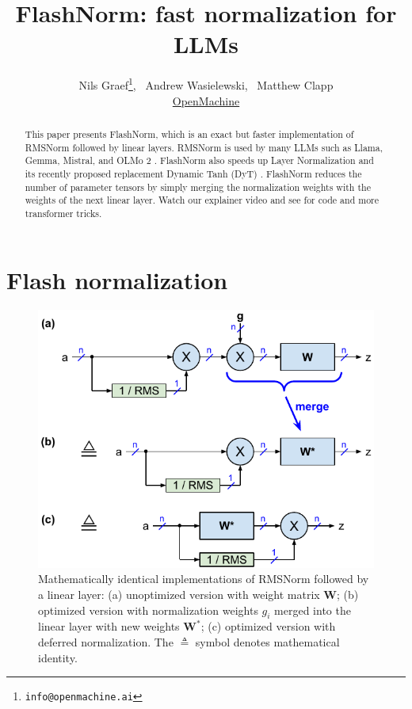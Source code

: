 \documentclass{article}
\title{FlashNorm: fast normalization for LLMs}
\author{Nils Graef\thanks{\texttt{info@openmachine.ai}}, \, Andrew Wasielewski, \, Matthew Clapp \\
  \href{https://openmachine.ai}{OpenMachine}}
\newcommand{\mat}[1]{\mathbf{#1}}     %
\def\W*{\mat{W}^\ast}                 %
\begin{document}
 \maketitle

\begin{abstract}
This paper presents FlashNorm, which is an exact but faster implementation of RMSNorm followed by linear layers. RMSNorm \citep{rms} is used by many LLMs such as Llama, Gemma, Mistral, and OLMo 2 \citep{LLaMA, gemma, mistral, olmo2}. FlashNorm also speeds up Layer Normalization \citep{layerNorm} and its recently proposed replacement Dynamic Tanh (DyT) \citep{DyT}. FlashNorm reduces the number of parameter tensors by simply merging the normalization weights with the weights of the next linear layer. Watch our explainer video \citep{flashNorm-video} and see \citep{slimAttn, tricks, remove, precompute} for code and more transformer tricks.
\end{abstract}

\section{Flash normalization}
\begin{figure}[h!] \centering  %
  \includegraphics[scale=1.0]{../doc/fig/flashNorm_fig1.pdf}
  \caption{Mathematically identical implementations of RMSNorm followed by a linear layer: (a) unoptimized version with weight matrix $\mat{W}$; (b) optimized version with normalization weights $g_i$ merged into the linear layer with new weights $\W*$; (c) optimized version with deferred normalization. The $\triangleq$ symbol denotes mathematical identity.}
\label{fig1} \end{figure}
\end{document}
